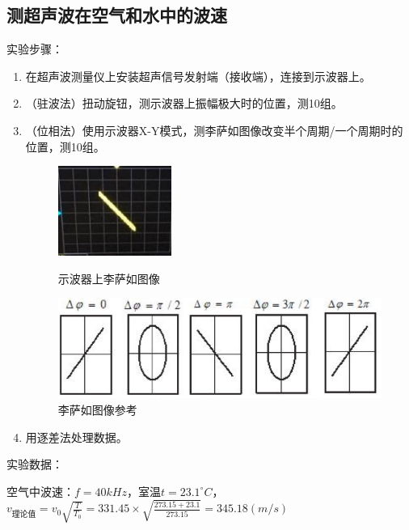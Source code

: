 \documentclass[11pt]{article}
\begin{document}
\subsection{测超声波在空气和水中的波速}
\noindent 实验步骤：
\begin{enumerate}
    \item 在超声波测量仪上安装超声信号发射端（接收端），连接到示波器上。
    \item （驻波法）扭动旋钮，测示波器上振幅极大时的位置，测10组。
    \item （位相法）使用示波器X-Y模式，测李萨如图像改变半个周期/一个周期时的位置，测10组。
    \begin{figure}[H]
        \centering
        \begin{minipage}[t]{0.25\linewidth}
            \centering
            \includegraphics[width=3.7cm]{Fig/fake.jpg}
            \caption{示波器上李萨如图像}
        \end{minipage}
        \begin{minipage}[t]{0.74\linewidth}
            \centering
            \includegraphics[width=12cm]{Fig/6.png}
            \caption{李萨如图像参考}
        \end{minipage} 
    \end{figure}
    \item 用逐差法处理数据。
\end{enumerate}
\noindent 实验数据：
\par \noindent 空气中波速：\quad$f=40kHz$，\qquad 室温$t=23.1^\circ C$，\qquad $v_{\text{理论值}}=v_0\sqrt{\frac{T}{T_0}}=331.45\times \sqrt{\frac{273.15+23.1}{273.15}}=345.18(m/s)$
\end{document}
